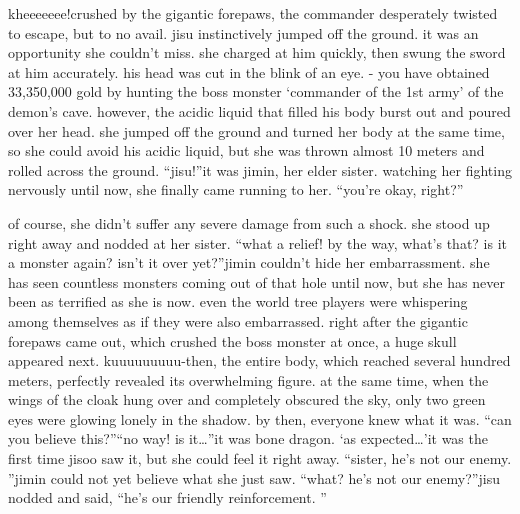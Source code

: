 kheeeeeee!crushed by the gigantic forepaws, the commander desperately twisted to escape, but to no avail.
jisu instinctively jumped off the ground.
 it was an opportunity she couldn’t miss.
 she charged at him quickly, then swung the sword at him accurately.
his head was cut in the blink of an eye.
- you have obtained 33,350,000 gold by hunting the boss monster ‘commander of the 1st army’ of the demon’s cave.
however, the acidic liquid that filled his body burst out and poured over her head.
she jumped off the ground and turned her body at the same time, so she could avoid his acidic liquid, but she was thrown almost 10 meters and rolled across the ground.
“jisu!”it was jimin, her elder sister.
 watching her fighting nervously until now, she finally came running to her.
“you’re okay, right?”

of course, she didn’t suffer any severe damage from such a shock.
 she stood up right away and nodded at her sister.
“what a relief! by the way, what’s that? is it a monster again? isn’t it over yet?”jimin couldn’t hide her embarrassment.
 she has seen countless monsters coming out of that hole until now, but she has never been as terrified as she is now.
 even the world tree players were whispering among themselves as if they were also embarrassed.
right after the gigantic forepaws came out, which crushed the boss monster at once, a huge skull appeared next.
kuuuuuuuuu-then, the entire body, which reached several hundred meters, perfectly revealed its overwhelming figure.
 at the same time, when the wings of the cloak hung over and completely obscured the sky, only two green eyes were glowing lonely in the shadow.
by then, everyone knew what it was.
“can you believe this?”“no way! is it…”it was bone dragon.
‘as expected…’it was the first time jisoo saw it, but she could feel it right away.
“sister, he’s not our enemy.
”jimin could not yet believe what she just saw.
“what? he’s not our enemy?”jisu nodded and said, “he’s our friendly reinforcement.
”

 